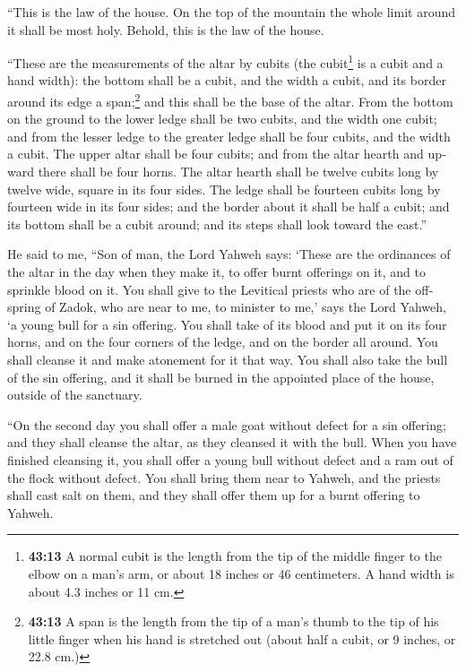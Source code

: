 \begin{paracol}{2}
\begin{otherlanguage}{english}
 ``This is the law of the house. On the top of the
mountain the whole limit around it shall be most holy. Behold, this is
the law of the house.

 ``These are the measurements of the altar by cubits (the
cubit\footnote{\textbf{43:13} A normal cubit is the length from the tip
  of the middle finger to the elbow on a man's arm, or about 18 inches
  or 46 centimeters. A hand width is about 4.3 inches or 11 cm.} is a
cubit and a hand width): the bottom shall be a cubit, and the width a
cubit, and its border around its edge a span;\footnote{\textbf{43:13} A
  span is the length from the tip of a man's thumb to the tip of his
  little finger when his hand is stretched out (about half a cubit, or 9
  inches, or 22.8 cm.)} and this shall be the base of the altar.
 From the bottom on the ground to the lower ledge shall
be two cubits, and the width one cubit; and from the lesser ledge to the
greater ledge shall be four cubits, and the width a cubit.
 The upper altar shall be four cubits; and from the altar
hearth and upward there shall be four horns.  The altar
hearth shall be twelve cubits long by twelve wide, square in its four
sides.  The ledge shall be fourteen cubits long by
fourteen wide in its four sides; and the border about it shall be half a
cubit; and its bottom shall be a cubit around; and its steps shall look
toward the east.''

 He said to me, ``Son of man, the Lord Yahweh says:
`These are the ordinances of the altar in the day when they make it, to
offer burnt offerings on it, and to sprinkle blood on it.
 You shall give to the Levitical priests who are of the
offspring of Zadok, who are near to me, to minister to me,' says the
Lord Yahweh, `a young bull for a sin offering.  You shall
take of its blood and put it on its four horns, and on the four corners
of the ledge, and on the border all around. You shall cleanse it and
make atonement for it that way.  You shall also take the
bull of the sin offering, and it shall be burned in the appointed place
of the house, outside of the sanctuary.

 ``On the second day you shall offer a male goat without
defect for a sin offering; and they shall cleanse the altar, as they
cleansed it with the bull.  When you have finished
cleansing it, you shall offer a young bull without defect and a ram out
of the flock without defect.  You shall bring them near
to Yahweh, and the priests shall cast salt on them, and they shall offer
them up for a burnt offering to Yahweh.


\end{otherlanguage}
\end{paracol}
